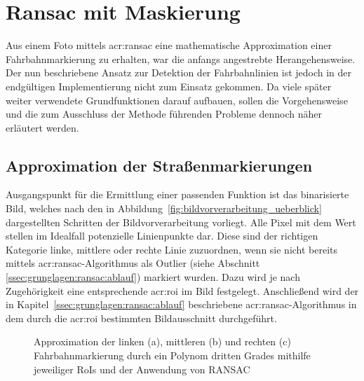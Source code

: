 \section{Ransac mit Maskierung \dcfirstauthorshort} 
\label{sec:maskenbau}
\label{sec:polynombasierte_fahrspurerkennung:ransac}

Aus einem Foto mittels \gls{acr:ransac} eine mathematische Approximation einer Fahrbahnmarkierung zu erhalten, war die anfangs angestrebte Herangehensweise. Der nun beschriebene Ansatz zur Detektion der Fahrbahnlinien ist jedoch in der endgültigen Implementierung nicht zum Einsatz gekommen. Da viele später weiter verwendete Grundfunktionen darauf aufbauen, sollen die Vorgehensweise und die zum Ausschluss der Methode führenden Probleme dennoch näher erläutert werden. 

\subsection{Approximation der Straßenmarkierungen}

Ausgangspunkt für die Ermittlung einer passenden Funktion ist das binarisierte Bild, welches nach den in Abbildung~\ref{fig:bildvorverarbeitung_ueberblick} dargestellten Schritten der Bildvorverarbeitung vorliegt. Alle Pixel mit dem Wert \grqq{} stellen im Idealfall potenzielle Linienpunkte dar. Diese sind der richtigen Kategorie \glqq linke\grqq , \glqq mittlere\grqq{} oder \glqq rechte\grqq{} Linie zuzuordnen, wenn sie nicht bereits mittels \gls{acr:ransac}-Algorithmus als Outlier (siehe Abschnitt \ref{ssec:grunglagen:ransac:ablauf}) markiert wurden. Dazu wird je nach Zugehörigkeit eine entsprechende \gls{acr:roi} im Bild festgelegt. Anschließend wird der in Kapitel~\ref{ssec:grunglagen:ransac:ablauf} beschriebene \gls{acr:ransac}-Algorithmus in dem durch die \gls{acr:roi} bestimmten Bildausschnitt durchgeführt.

\begin{figure}[htbp]
	\centering
	\hfill
	\hfill
	\caption{Approximation der linken (a), mittleren (b) und rechten (c) Fahrbahnmarkierung durch ein Polynom dritten Grades mithilfe jeweiliger RoIs und der Anwendung von RANSAC}
	\label{fig:fahrspurerkennung_ransac_masken}
\end{figure} 

